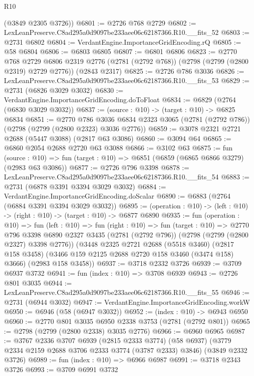 \begin{lexlean}{R10}
\begin{coremodule}
      (@3849 @2305 @3726))
@6801 := @2726 @768 @2729
@6802 := LexLeanPreserve.C8ad295a0d9097be233aee06c62187366.R10.__fits_52
@6803 := @2731 @6802
@6804 := VerdantEngine.ImportanceGridEncoding.rQ
@6805 := @58 @6804
@6806 := @6803 @6805
@6807 := @6801 @6806
@6823 := @2770
    @768
    @2729
    @6806
    @2319
    @2776
    (@2781 (@2792 @768))
    (@2798 (@2799 (@2800 @2319) @2729 @2776))
    (@2843 @2317)
@6825 := @2726 @786 @3036
@6826 := LexLeanPreserve.C8ad295a0d9097be233aee06c62187366.R10.__fits_53
@6829 := @2731 (@6826 @3029 @3032)
@6830 := VerdantEngine.ImportanceGridEncoding.doToFloat
@6834 := @6829 (@2764 (@6830 @3029 @3032))
@6837 := (source : @10) -> (target : @10) -> @6825 @6834
@6851 := @2770
    @786
    @3036
    @6834
    @2323
    @3065
    (@2781 (@2792 @786))
    (@2798 (@2799 (@2800 @2323) @3036 @2776))
@6859 := @3078 @2321 @2721 @2688 (@5447 @3088) (@2817 @63 @3086)
@6860 := @3094 @64
@6865 := @6860 @2054 @2688 @2720 @63 @3088
@6866 := @3102 @63
@6875 := fun (source : @10) =>
  fun (target : @10) => @6851 (@6859 (@6865 @6866 @3279) (@2983 @63 @3086))
@6877 := @2726 @796 @3398
@6878 := LexLeanPreserve.C8ad295a0d9097be233aee06c62187366.R10.__fits_54
@6883 := @2731 (@6878 @3391 @3394 @3029 @3032)
@6884 := VerdantEngine.ImportanceGridEncoding.doScalar
@6890 := @6883 (@2764 (@6884 @3391 @3394 @3029 @3032))
@6895 := (operation : @10) -> (left : @10) -> (right : @10) -> (target : @10) -> @6877 @6890
@6935 := fun (operation : @10) =>
  fun (left : @10) =>
  fun (right : @10) =>
  fun (target : @10) =>
  @2770
    @796
    @3398
    @6890
    @2327
    @3435
    (@2781 (@2792 @796))
    (@2798 (@2799 (@2800 @2327) @3398 @2776))
    (@3448
      @2325
      @2721
      @2688
      (@5518 @3460)
      (@2817 @158 @3458)
      (@3466 @159 @2125 @2688 @2720 @158 @3460 (@3474 @158) @3666)
      (@2983 @158 @3458))
@6937 := @3718 @2332 @3726
@6939 := @3709 @6937 @3732
@6941 := fun (index : @10) => @3708 @6939
@6943 := @2726 @801 @3035
@6944 := LexLeanPreserve.C8ad295a0d9097be233aee06c62187366.R10.__fits_55
@6946 := @2731 (@6944 @3032)
@6947 := VerdantEngine.ImportanceGridEncoding.workW
@6950 := @6946 (@58 (@6947 @3032))
@6952 := (index : @10) -> @6943 @6950
@6960 := @2770 @801 @3035 @6950 @2338 @3753 (@2781 (@2792 @801))
@6965 := @2798 (@2799 (@2800 @2338) @3035 @2776)
@6966 := @6960 @6965
@6987 := @3767
    @2336
    @3707
    @6939
    (@2815 @2333 @3774)
    (@58 @6937)
    (@3779 @2334 @2159 @2688 @3706 @2333 @3774 (@3787 @2333) @3846)
    (@3849 @2332 @3726)
@6989 := fun (index : @10) => @6966 @6987
@6991 := @3718 @2343 @3726
@6993 := @3709 @6991 @3732

\end{coremodule}
\end{lexlean}

